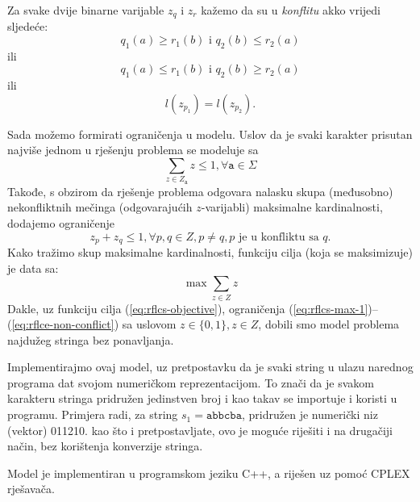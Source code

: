 \documentclass[a4paper, utf8, 11pt, colorlinks]{book}
\theoremstyle{definition}
\begin{document}
Za svake dvije binarne varijable $z_{q}$ i $z_{r}$ kažemo da su u \emph{konflitu} akko vrijedi sljedeće: $$ q_1(a) \geq r_1(b) \mbox{ i } q_2(b) \leq r_2(a)     $$ 
ili 
 $$ q_1(a) \leq r_1(b) \mbox{ i } q_2(b) \geq r_2(a)$$ 
ili 
$$ l(z_{p_1}) = l(z_{p_2}).$$

Sada možemo formirati ograničenja u modelu. Uslov da je svaki karakter prisutan najviše jednom u rješenju problema se modeluje sa 
\begin{equation}\label{eq:rflcs-max-1}
	 \sum_{z \in  Z_{\texttt{a} }} z \leq 1, \forall \texttt{a} \in \Sigma 
\end{equation}
Takođe, s obzirom da rješenje problema odgovara nalasku skupa (međusobno) nekonfliktnih mečinga (odgovarajućih $z$-varijabli) maksimalne kardinalnosti, dodajemo ograničenje
\begin{equation}\label{eq:rflce-non-conflict}
	 z_{p} + z_q \leq 1, \forall p,q \in Z, p\neq q, p\mbox{ je u konfliktu sa } q.
\end{equation}
Kako tražimo skup maksimalne kardinalnosti, funkciju cilja (koja se maksimizuje) je data sa:
\begin{equation}\label{eq:rflcs-objective}
	 \max \sum_{z \in Z } z 
\end{equation}
Dakle, uz funkciju cilja (\ref{eq:rflcs-objective}), ograničenja (\ref{eq:rflcs-max-1})--(\ref{eq:rflce-non-conflict}) sa uslovom $z \in \{0, 1\}, z \in Z$, dobili smo model problema najdužeg stringa bez ponavljanja. 

 Implementirajmo ovaj model, uz pretpostavku da je svaki string u ulazu narednog programa dat svojom numeričkom reprezentacijom. To znači da je svakom karakteru stringa pridružen jedinstven broj i kao takav se importuje i koristi u programu. Primjera radi, za string $s_1=\texttt{abbcba}$, pridružen je numerički niz (vektor) 011210. kao što i pretpostavljate, ovo je moguće riješiti i na drugačiji način, bez korištenja konverzije stringa. 
 
 Model je implementiran u programskom jeziku C++, a riješen uz pomoć CPLEX rješavača. 
 
\end{document}
